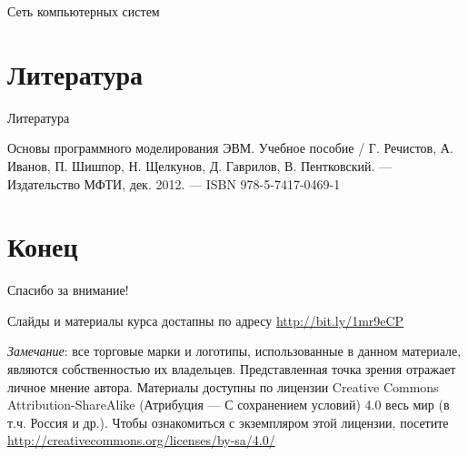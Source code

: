 \documentclass{beamer}
\begin{document}
\begin{frame}{Сеть компьютерных систем}
\begin{tikzpicture}[>=latex]

\end{tikzpicture}
\end{frame}



\section{Литература}

\begin{frame}[allowframebreaks]{Литература}
\begin{thebibliography}{99}
     Основы программного моделирования ЭВМ. Учебное пособие / Г. Речистов, А. Иванов, П. Шишпор, Н. Щелкунов, Д. Гаврилов, В. Пентковский. — Издательство МФТИ, дек. 2012. — ISBN 978-5-7417-0469-1

\end{thebibliography}
\end{frame}


\section{Конец}
\begin{frame}

{\huge{Спасибо за внимание!}\par}

\vfill

Слайды и материалы курса достапны по адресу \url{http://bit.ly/1mr9eCP} %

\vfill

\tiny{\textit{Замечание}: все торговые марки и логотипы, использованные в данном материале, являются собственностью их владельцев. Представленная точка зрения отражает личное мнение автора. Материалы доступны по лицензии Creative Commons Attribution-ShareAlike (Атрибуция — С сохранением условий) 4.0 весь мир (в т.ч. Россия и др.). Чтобы ознакомиться с экземпляром этой лицензии, посетите \url{http://creativecommons.org/licenses/by-sa/4.0/}}

\end{frame}

\end{document}
